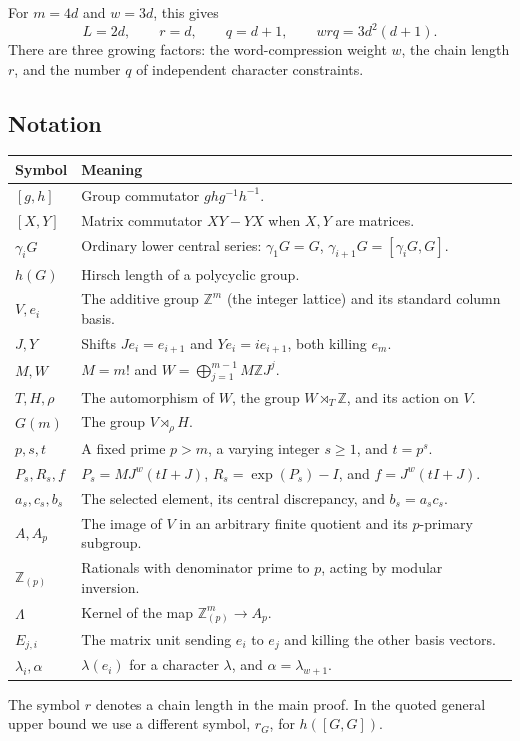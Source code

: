 \documentclass[11pt]{article}
\numberwithin{equation}{section}
\theoremstyle{definition}
\theoremstyle{remark}
\newcommand{\Z}{\mathbb Z}
\newcommand{\Rloc}{\mathbb Z_{(p)}}
\begin{document}
For $m=4d$ and $w=3d$, this gives
\[
L=2d,\qquad r=d,\qquad q=d+1,\qquad wrq=3d^2(d+1).
\]
There are three growing factors: the word-compression weight $w$, the chain length $r$, and the number $q$ of independent character constraints.

\subsection{Notation}
\begin{longtable}{@{}p{}p{}@{}}
\toprule
Symbol & Meaning \\
\midrule
\endhead
$[g,h]$ & Group commutator $ghg^{-1}h^{-1}$. \\
$[X,Y]$ & Matrix commutator $XY-YX$ when $X,Y$ are matrices. \\
$\gamma_iG$ & Ordinary lower central series: $\gamma_1G=G$, $\gamma_{i+1}G=[\gamma_iG,G]$. \\
$h(G)$ & Hirsch length of a polycyclic group. \\
$V,e_i$ & The additive group $\Z^m$ (the integer lattice) and its standard column basis. \\
$J,Y$ & Shifts $Je_i=e_{i+1}$ and $Ye_i=i e_{i+1}$, both killing $e_m$. \\
$M,W$ & $M=m!$ and $W=\bigoplus_{j=1}^{m-1}M\Z J^j$. \\
$T,H,\rho$ & The automorphism of $W$, the group $W\rtimes_T\Z$, and its action on $V$. \\
$G(m)$ & The group $V\rtimes_\rho H$. \\
$p,s,t$ & A fixed prime $p>m$, a varying integer $s\ge1$, and $t=p^s$. \\
$P_s,R_s,f$ & $P_s=MJ^w(tI+J)$, $R_s=\exp(P_s)-I$, and $f=J^w(tI+J)$. \\
$a_s,c_s,b_s$ & The selected element, its central discrepancy, and $b_s=a_sc_s$. \\
$A,A_p$ & The image of $V$ in an arbitrary finite quotient and its $p$-primary subgroup. \\
$\Rloc$ & Rationals with denominator prime to $p$, acting by modular inversion. \\
$\Lambda$ & Kernel of the map $\Rloc^m\to A_p$. \\
$E_{j,i}$ & The matrix unit sending $e_i$ to $e_j$ and killing the other basis vectors. \\
$\lambda_i,\alpha$ & $\lambda(e_i)$ for a character $\lambda$, and $\alpha=\lambda_{w+1}$. \\
\bottomrule
\end{longtable}
The symbol $r$ denotes a chain length in the main proof. In the quoted general upper bound we use a different symbol, $r_G$, for $h([G,G])$.
\end{document}
